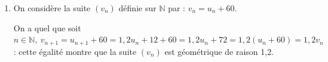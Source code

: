 \documentclass[10pt]{article}
\providecommand{\N}{\mathbb{N}}
\begin{document}
\begin{enumerate}
\item On considère la suite $\left(v_n\right)$ définie sur $\N$ par : $v_n = u_n + 60$. 









On a quel que soit $n \in \N, \: v_{n+1} = u_{n+1} + 60 =  1,2u_n + 12 + 60 = 1,2u_n + 72 = 1,2\left(u_n + 60\right) = 1,2v_n$ : cette égalité montre que la suite $\left(v_n\right)$ est géométrique de raison 1,2.
\end{enumerate}

\bigskip
\end{document}
